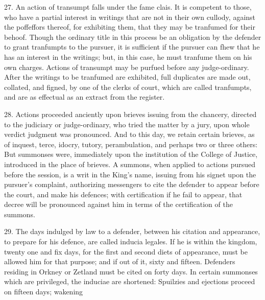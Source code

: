 \documentclass{article}
\begin{document}
27. An action of transumpt falls under the fame clais. It is competent to those, who have a partial interest in writings that are not in their own cullody, against the poffeffors thereof, for exhibiting them, that they may be tranfumed for their behoof. Though the ordinary title in this process be an obligation by the defender to grant tranfumpts to the pursuer, it is sufficient if the pursuer can fhew that he has an interest in the writings; but, in this case, he must tranfume them on his own charges. Actions of transumpt may be purfued before any judge-ordinary. After the writings to be tranfumed are exhibited, full duplicates are made out, collated, and figned, by one of the clerks of court, which are called tranfumpts, and are as effectual as an extract from the register.

28. Actions proceeded anciently upon brieves issuing from the chancery, directed to the judiciary or judge-ordinary, who tried the matter by a jury, upon whole verdict judgment was pronounced. And to this day, we retain certain brieves, as of inquest, terce, idocry, tutory, perambulation, and perhaps two or three others: But summonses were, immediately upon the institution of the College of Justice, introduced in the place of brieves. A summons, when applied to actions pursued before the session, is a writ in the King's name, issuing from his signet upon the pursuer's complaint, authorizing messengers to cite the defender to appear before the court, and make his defences; with certification if he fail to appear, that decree will be pronounced against him in terms of the certification of the summons.

29. The days indulged by law to a defender, between his citation and appearance, to prepare for his defence, are called inducia legales. If he is within the kingdom, twenty one and fix days, for the first and second diets of appearance, must be allowed him for that purpose; and if out of it, sixty and fifteen. Defenders residing in Orkney or Zetland must be cited on forty days. In certain summonses which are privileged, the induciae are shortened: Spuilzies and ejections proceed on fifteen days; wakening
\end{document}
